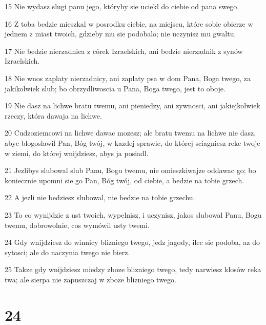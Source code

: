 \par 15 Nie wydasz slugi panu jego, któryby sie uciekl do ciebie od pana swego.
\par 16 Z toba bedzie mieszkal w posrodku ciebie, na miejscu, które sobie obierze w jednem z miast twoich, gdzieby mu sie podobalo; nie uczynisz mu gwaltu.
\par 17 Nie bedzie nierzadnica z córek Izraelskich, ani bedzie nierzadnik z synów Izraelskich.
\par 18 Nie wnos zaplaty nierzadnicy, ani zaplaty psa w dom Pana, Boga twego, za jakikolwiek slub; bo obrzydliwoscia u Pana, Boga twego, jest to oboje.
\par 19 Nie dasz na lichwe bratu twemu, ani pieniedzy, ani zywnosci, ani jakiejkolwiek rzeczy, która dawaja na lichwe.
\par 20 Cudzoziemcowi na lichwe dawac mozesz; ale bratu twemu na lichwe nie dasz, abyc blogoslawil Pan, Bóg twój, w kazdej sprawie, do której sciagniesz reke twoje w ziemi, do której wnijdziesz, abys ja posiadl.
\par 21 Jezlibys slubowal slub Panu, Bogu twemu, nie omieszkiwajze oddawac go; bo koniecznie upomni sie go Pan, Bóg twój, od ciebie, a bedzie na tobie grzech.
\par 22 A jezli nie bedziesz slubowal, nie bedzie na tobie grzechu.
\par 23 To co wynijdzie z ust twoich, wypelnisz, i uczynisz, jakos slubowal Panu, Bogu twemu, dobrowolnie, cos wymówil usty twemi.
\par 24 Gdy wnijdziesz do winnicy blizniego twego, jedz jagody, ilec sie podoba, az do sytosci; ale do naczynia twego nie bierz.
\par 25 Takze gdy wnijdziesz miedzy zboze blizniego twego, tedy narwiesz klosów reka twa; ale sierpa nie zapuszczaj w zboze blizniego twego.

\chapter{24}

